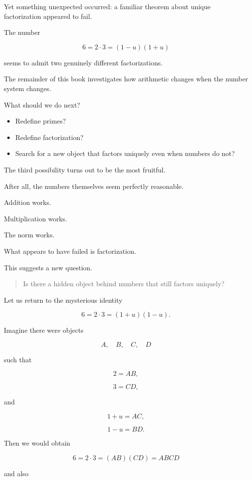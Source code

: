 Yet something unexpected occurred: a familiar theorem about unique factorization appeared to fail.

The number

\[
6 = 2\cdot3 = (1-u)(1+u)
\]

seems to admit two genuinely different factorizations.

The remainder of this book investigates how arithmetic changes when the number system changes.

\vspace{0.5cm}

What should we do next?

\begin{itemize}
\item Redefine primes?
\item Redefine factorization?
\item Search for a new object that factors uniquely even when numbers do not?
\end{itemize}

The third possibility turns out to be the most fruitful.

After all, the numbers themselves seem perfectly reasonable.

Addition works.

Multiplication works.

The norm works.

What appears to have failed is factorization.

This suggests a new question.

\begin{quote}
Is there a hidden object behind numbers that still factors uniquely?
\end{quote}

Let us return to the mysterious identity

\[
6=2\cdot3=(1+u)(1-u).
\]

Imagine there were objects

\[
A,\quad B,\quad C,\quad D
\]

such that

\[
2=AB,
\]

\[
3=CD,
\]

and

\[
1+u=AC,
\]

\[
1-u=BD.
\]

Then we would obtain

\[
6 = 2\cdot3 = (AB)(CD) =
ABCD
\]

and also

